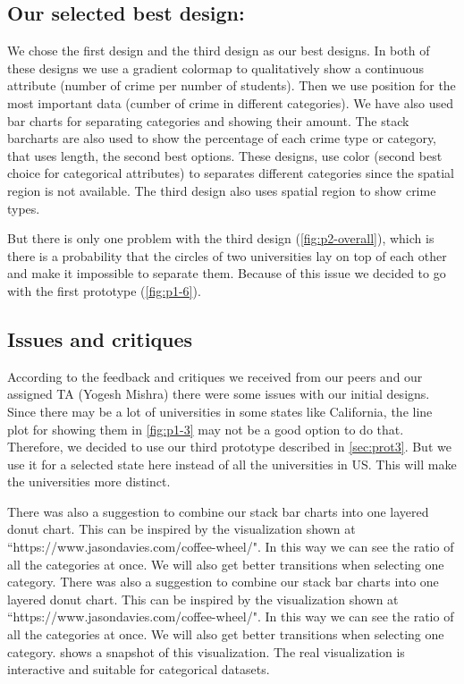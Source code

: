 \documentclass[12pt]{article}
\begin{document}
\subsection{Our selected best design:}

We chose the first design and the third design as our best designs. In both of these designs we use a gradient colormap to qualitatively show a continuous attribute (number of crime per number of students). Then we use position for the most important data (cumber of crime in different categories). We have also used bar charts for separating categories and showing their amount. The stack barcharts are also used to show the percentage of each crime type or category, that uses length, the second best options. These designs, use color (second best choice for categorical attributes) to separates different categories since the spatial region is not available. The third design also uses spatial region to show crime types. 

But there is only one problem with the third design (\cref{fig:p2-overall}), which is there is a probability that the circles of two universities lay on top of each other and make it impossible to separate them. Because of this issue we decided to go with the first prototype (\cref{fig:p1-6}).

\subsection{Issues and critiques}
According to the feedback and critiques we received from our peers and our assigned TA (Yogesh Mishra) there were some issues with our initial designs. Since there may be a lot of  universities in some states like California, the line plot for showing them in \cref{fig:p1-3} may not be a good option to do that. Therefore, we decided to use our third prototype described in \cref{sec:prot3}. But we use it for a selected state here instead of all the universities in US. This will make the universities more distinct.

There was also a suggestion to combine our stack bar charts into one layered donut chart. This can be inspired by the visualization shown at ``https://www.jasondavies.com/coffee-wheel/". In this way we can see the ratio of all the categories at once. We will also get better transitions when selecting one category. There was also a suggestion to combine our stack bar charts into one layered donut chart. This can be inspired by the visualization shown at ``https://www.jasondavies.com/coffee-wheel/". In this way we can see the ratio of all the categories at once. We will also get better transitions when selecting one category.  shows a snapshot of this visualization. The real visualization is interactive and suitable for categorical datasets.
\end{document}
